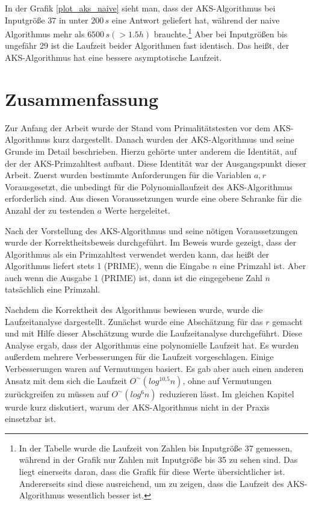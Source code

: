 \documentclass[12pt,oneside]{article}
\theoremstyle{remark}
\theoremstyle{definition}
\begin{document}
In der Grafik \ref{plot_aks_naive} sieht man, dass der AKS-Algorithmus bei Inputgröße $37$ in unter $200 \, s$ eine Antwort geliefert hat, während der naive Algorithmus mehr als $6500 \, s(> 1.5 h)$ brauchte.\footnote{In der Tabelle wurde die Laufzeit von Zahlen bis Inputgröße 37 gemessen, während in der Grafik nur Zahlen mit Inputgröße bis 35 zu sehen sind. Das liegt  einerseits daran, dass die Grafik für diese Werte übersichtlicher ist. Andererseits sind diese ausreichend, um zu zeigen, dass die Laufzeit des AKS-Algorithmus wesentlich besser ist.} Aber bei Inputgrößen bis ungefähr 29 ist die Laufzeit beider Algorithmen fast identisch. Das heißt, der AKS-Algorithmus hat eine bessere asymptotische Laufzeit. 

\newpage

\section{Zusammenfassung}
Zur Anfang der Arbeit wurde der Stand vom Primalitätstesten vor dem AKS-Algorithmus kurz dargestellt. Danach wurden der AKS-Algorithmus und seine Grunde im Detail beschrieben. Hierzu gehörte unter anderem die Identität, auf der der AKS-Primzahltest aufbaut. Diese Identität war der Ausgangspunkt dieser Arbeit. Zuerst wurden bestimmte Anforderungen für die Variablen $a,r$ Vorausgesetzt, die unbedingt für die Polynomiallaufzeit des AKS-Algorithmus erforderlich sind. Aus diesen Voraussetzungen wurde eine obere Schranke für die Anzahl der zu testenden $a$ Werte hergeleitet.

Nach der Vorstellung des AKS-Algorithmus und seine nötigen Voraussetzungen wurde der Korrektheitsbeweis durchgeführt. Im Beweis wurde gezeigt, dass der Algorithmus als ein Primzahltest verwendet werden kann, das heißt der Algorithmus liefert stets 1 (PRIME), wenn die Eingabe $n$ eine Primzahl ist. Aber auch wenn die Ausgabe 1 (PRIME) ist, dann ist die eingegebene Zahl $n$ tatsächlich eine Primzahl.

Nachdem die Korrektheit des Algorithmus bewiesen wurde, wurde die Laufzeitanalyse dargestellt. Zunächst wurde eine Abschätzung für das $r$ gemacht und mit Hilfe dieser Abschätzung wurde die Laufzeitanalyse durchgeführt. Diese Analyse ergab, dass der Algorithmus eine polynomielle Laufzeit hat. Es wurden außerdem mehrere Verbesserungen für die Laufzeit vorgeschlagen. Einige Verbesserungen waren auf Vermutungen basiert. Es gab aber auch einen anderen Ansatz mit dem sich die Laufzeit $O^{\sim}(log^{10.5}n)$, ohne auf Vermutungen zurückgreifen zu müssen auf $O^{\sim}(log^6n)$ reduzieren lässt. Im gleichen Kapitel wurde kurz diskutiert, warum der AKS-Algorithmus nicht in der Praxis einsetzbar ist.
\end{document}

